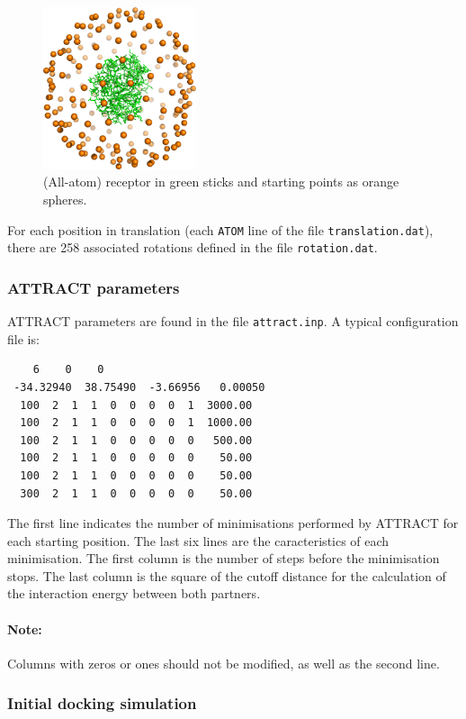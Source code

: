 \documentclass[12pt,a4paper]{article}
\begin{document}
\begin{figure}[htbp]
\center
\includegraphics*[width=0.4\textwidth]{img/1CGI_translation.png}
\caption{(All-atom) receptor in green sticks and starting points as orange spheres.}
\end{figure}

For each position in translation (each {\tt ATOM} line of the file {\tt translation.dat}), 
there are 258 associated rotations defined in the file {\tt rotation.dat}. 

\subsubsection{ATTRACT parameters}

ATTRACT parameters are found in the file {\tt attract.inp}. A typical configuration file is:
\begin{verbatim}
    6    0    0
 -34.32940  38.75490  -3.66956   0.00050
  100  2  1  1  0  0  0  0  1  3000.00   
  100  2  1  1  0  0  0  0  1  1000.00   
  100  2  1  1  0  0  0  0  0   500.00   
  100  2  1  1  0  0  0  0  0    50.00   
  100  2  1  1  0  0  0  0  0    50.00   
  300  2  1  1  0  0  0  0  0    50.00
\end{verbatim}

The first line indicates the number of minimisations performed by ATTRACT for each starting position. 
The last six lines are the caracteristics of each minimisation. The first column is the number of steps before the minimisation stops. 
The last column is the square of the cutoff distance for the calculation of the interaction energy between both partners.

\paragraph{Note:} Columns with zeros or ones should not be modified, as well as the second line.

\subsubsection{Initial docking simulation}
\end{document}

